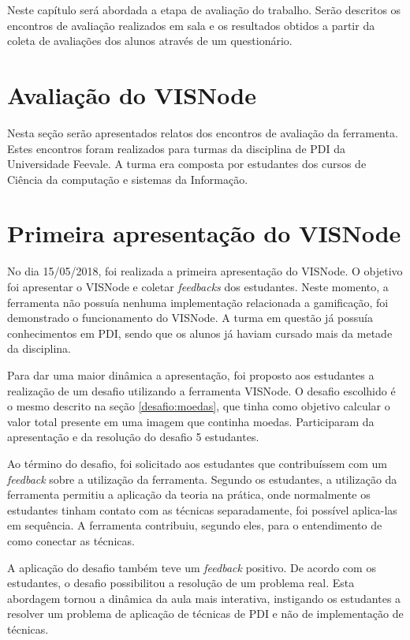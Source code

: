 \documentclass[
	12pt,				%
	oneside,			%
	a4paper,			%
	english,			%
	french,				%
	spanish,			%
	brazil,				%
	]{abntex2}
\begin{document}
Neste capítulo será abordada a etapa de avaliação do trabalho. Serão descritos os encontros de avaliação realizados em sala e os resultados obtidos a partir da coleta de avaliações dos alunos através de um questionário.

\section{Avaliação do VISNode}

Nesta seção serão apresentados relatos dos encontros de avaliação da ferramenta. Estes encontros foram realizados para turmas da disciplina de PDI da Universidade Feevale. A turma era composta por estudantes dos cursos de Ciência da computação e sistemas da Informação.

\section{Primeira apresentação do VISNode}
\label{validacao:piloto1}

No dia 15/05/2018, foi realizada a primeira apresentação do VISNode. O objetivo foi apresentar o VISNode e coletar \textit{feedbacks} dos estudantes. Neste momento, a ferramenta não possuía nenhuma implementação relacionada a gamificação, foi demonstrado o funcionamento do VISNode. A turma em questão já possuía conhecimentos em PDI, sendo que os alunos já haviam cursado mais da metade da disciplina.

Para dar uma maior dinâmica a apresentação, foi proposto aos estudantes a realização de um desafio utilizando a ferramenta VISNode. O desafio escolhido é o mesmo descrito na seção \ref{desafio:moedas}, que tinha como objetivo calcular o valor total presente em uma imagem que continha moedas. Participaram da apresentação e da resolução do desafio 5 estudantes.

Ao término do desafio, foi solicitado aos estudantes que contribuíssem com um \textit{feedback} sobre a utilização da ferramenta. Segundo os estudantes, a utilização da ferramenta permitiu a aplicação da teoria na prática, onde normalmente os estudantes tinham contato com as técnicas separadamente, foi possível aplica-las em sequência. A ferramenta contribuiu, segundo eles, para o entendimento de como conectar as técnicas.

A aplicação do desafio também teve um \textit{feedback} positivo. De acordo com os estudantes, o desafio possibilitou a resolução de um problema real. Esta abordagem tornou a dinâmica da aula mais interativa, instigando os estudantes a resolver um problema de aplicação de técnicas de PDI e não de implementação de técnicas.
\end{document}
